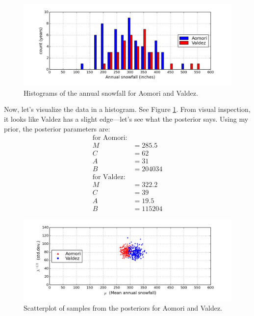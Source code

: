 \documentclass[12pt]{article}
\begin{document}
\begin{figure}
  \begin{center}
    \includegraphics[width=1\textwidth]{code/snow-histogram-1.png}
  \end{center}
  \caption{Histograms of the annual snowfall for Aomori and Valdez.}
  \label{figure:snow-histogram}
\end{figure}


Now, let's visualize the data in a histogram. See Figure \ref{figure:snow-histogram}. From visual inspection, it looks like Valdez has a slight edge---let's see what the posterior says. Using my prior, the posterior parameters are:
\begin{align*}
\text{for Aomori:} & \\
    M & = 285.5\\
    C & = 62\\
    A & = 31\\ 
    B &= 204034\\
\text{for Valdez:} & \\
    M & = 322.2\\
    C & = 39\\
    A & = 19.5\\
    B &= 115204
\end{align*}

\begin{figure}
  \begin{center}
    \includegraphics[width=1\textwidth]{code/snow-posteriors-1.png}
  \end{center}
  \caption{Scatterplot of samples from the posteriors for Aomori and Valdez.}
  \label{figure:snow-posteriors}
\end{figure}
\end{document}
